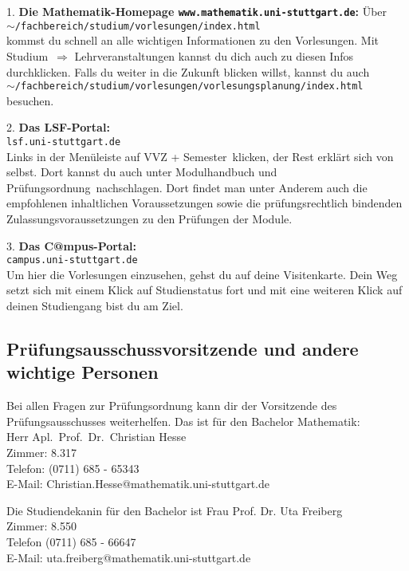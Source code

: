 1. {\bf Die Mathematik-Homepage {\verb|www.mathematik.uni-stuttgart.de|}:}
Über\\ 
$ \sim ${\verb|/fachbereich/studium/vorlesungen/index.html|}\\
kommst du schnell an alle wichtigen Informationen zu den Vorlesungen.
Mit \glqq Studium\grqq\ $\Rightarrow$ \glqq Lehrveranstaltungen\grqq 
kannst du dich auch zu diesen Infos durchklicken.
Falls du weiter in die Zukunft blicken willst, kannst du auch\\
$ \sim ${\verb|/fachbereich/studium/vorlesungen/vorlesungsplanung/index.html|}\\
besuchen.


2. {\bf Das LSF-Portal:}\\
{\verb|lsf.uni-stuttgart.de|}\\
Links in der Menüleiste auf \glqq VVZ + Semester\grqq\ klicken,
der Rest erklärt sich von selbst.
Dort kannst du auch unter \glqq Modulhandbuch
und Prüfungsordnung\grqq\ nachschlagen.
Dort findet man unter Anderem
auch die empfohlenen inhaltlichen Voraussetzungen
sowie die prüfungsrechtlich bindenden
Zulassungsvoraussetzungen zu den Prüfungen der Module.

3. {\bf Das C@mpus-Portal:}\\
{\verb|campus.uni-stuttgart.de|}\\
Um hier die Vorlesungen einzusehen, gehst du auf deine Visitenkarte.
Dein Weg setzt sich mit einem Klick auf Studienstatus fort und mit
eine weiteren Klick auf deinen Studiengang bist du am Ziel.

\newpage
\subsection{Prüfungsausschussvorsitzende und andere wichtige Personen}

Bei allen Fragen zur Prüfungsordnung
kann dir der Vorsitzende des Prüfungsausschusses weiterhelfen.
Das ist für den Bachelor Mathematik:\\
Herr Apl.~Prof.~Dr.~Christian Hesse\\
Zimmer: 8.317\\
Telefon: (0711) 685 - 65343\\
E-Mail: Christian.Hesse@mathematik.uni-stuttgart.de

Die Studiendekanin für den  Bachelor ist
Frau Prof. Dr. Uta Freiberg\\
Zimmer: 8.550\\
Telefon (0711) 685 - 66647\\
E-Mail:  uta.freiberg@mathematik.uni-stuttgart.de

